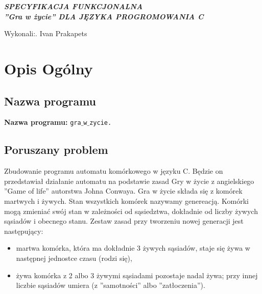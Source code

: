\documentclass[a4paper, 12pt]{article}
\newcommand{\mainmatter}{\clearpage \cfoot{\thepage\ of \pageref{LastPage}}
\pagenumbering{arabic}}
\begin{document}
	\begin{titlepage}
		
		\begin{center}

    	\vspace{5cm}
    		\Large\textit{\textbf{SPECYFIKACJA FUNKCJONALNA 
    		\\''Gra w życie'' DLA JĘZYKA PROGROMOWANIA C}}\\ 
		\vspace{15cm}
		\end{center} 

		\hfill\begin{minipage}{0.5\textwidth}
			\Large Wykonali:. Ivan Prakapets \newline
		\vspace{\baselineskip}
		\end{minipage}
	\end{titlepage}
\newpage
\mainmatter
\setlength{\headheight}{15pt}
\doublespacing
\tableofcontents
\newpage

	\section{Opis Ogólny}
		\subsection{Nazwa programu} 
			\textbf{Nazwa programu:} \texttt{gra$\_$w$\_$zycie.}
			
		\subsection{Poruszany problem}
			\hspace*{1cm} Zbudowanie programu automatu komórkowego w języku C. Będzie on przedstawiał działanie automatu na podstawie zasad Gry w życie z angielskiego ''Game of life'' autorstwa Johna Conwaya.\newline
			\hspace*{1cm} Gra w życie składa się z komórek martwych i żywych. Stan wszystkich komórek nazywamy genereacją. Komórki mogą zmieniać swój stan w zależności od sąsiedztwa, dokładnie od liczby żywych sąsiadów i obecnego stanu.
			\hspace*{1cm} Zestaw zasad przy tworzeniu nowej generacji  jest następujący:

		\begin{itemize}
			\item martwa komórka, która ma dokładnie 3 żywych sąsiadów, staje się żywa w następnej jednostce czasu (rodzi się),
			\item żywa komórka z 2 albo 3 żywymi sąsiadami pozostaje nadal żywa; przy innej liczbie sąsiadów umiera (z ''samotności'' albo ''zatłoczenia'').
		\end{itemize}
		
\end{document}
